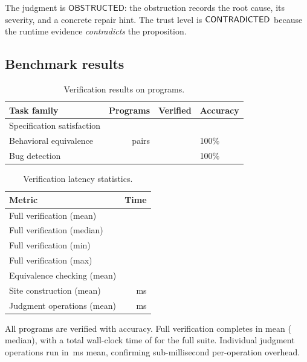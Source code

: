 \documentclass[11pt]{article}
\begin{document}
The judgment is $\mathsf{OBSTRUCTED}$: the obstruction records the root
cause, its severity, and a concrete repair hint.  The trust level is
$\mathsf{CONTRADICTED}$ because the runtime evidence \emph{contradicts} the proposition.

\subsection{Benchmark results}

\begin{table}[t]
\centering
\caption{Verification results on \compTotalPrograms{} \Python{} programs.}\label{tab:results}
\begin{tabular}{@{}lrrl@{}}
\toprule
\textbf{Task family} & \textbf{Programs} & \textbf{Verified}
  & \textbf{Accuracy} \\
\midrule
Specification satisfaction & \compTotalPrograms{} & \compTotalVerified{} & \compOverallAccuracy{} \\
Behavioral equivalence     & \compEquivPairs{} pairs & \compEquivBothVerified{} & 100\% \\
Bug detection              & \compBuggyCount{} & \compBuggyFullPass{} & 100\% \\
\bottomrule
\end{tabular}
\end{table}

\begin{table}[t]
\centering
\caption{Verification latency statistics.}\label{tab:latency}
\begin{tabular}{@{}lr@{}}
\toprule
\textbf{Metric} & \textbf{Time} \\
\midrule
Full verification (mean)     & \compTimeMean{} \\
Full verification (median)   & \compTimeMedian{} \\
Full verification (min)      & \compTimeMin{} \\
Full verification (max)      & \compTimeMax{} \\
Equivalence checking (mean)  & \compEquivMeanTime{} \\
Site construction (mean)     & \compSiteMeanBuildMs{}\,ms \\
Judgment operations (mean)   & \compMethodsMeanMs{}\,ms \\
\bottomrule
\end{tabular}
\end{table}

All \compTotalPrograms{} programs are verified with \compOverallAccuracy{}
accuracy.  Full verification completes in \compTimeMean{} mean
(\compTimeMedian{} median), with a total wall-clock time of
\compTimeTotal{} for the full suite.  Individual judgment operations
run in \compMethodsMeanMs{}\,ms mean, confirming sub-millisecond
per-operation overhead.
\end{document}
